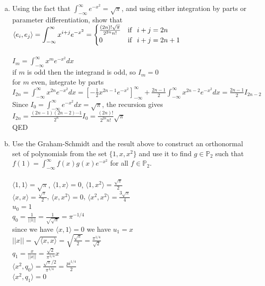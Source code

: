 \documentclass{article}
\begin{document}
{{\begin{enumerate}
\begin{enumerate}[a.]
\item Using the fact that $\displaystyle{\int^{\infty}_{-\infty}{e^{-x^2}}}=\sqrt{\pi}$, and using either integration by parts or parameter differentiation, show that $\langle e_i,e_j \rangle =\displaystyle{\int^{\infty}_{-\infty}{x^{i+j}e^{-x^2}}}=\begin{cases}\frac{(2n)!\sqrt{\pi}}{2^{2n}n!} &{\rm if}~~ i+j=2n\\ 
0 &{\rm if}~~ i+j=2n+1
\end{cases}$
\\
\\$I_m=\int^{\infty}_{-\infty}x^me^{-x^2}dx$
\\if $m$ is odd then the integrand is odd, so $I_m=0$
\\for $m$ even, integrate by parts
\\$I_{2n}=\int^{\infty}_{-\infty}x^{2n}e^{-x^2}dx=[-\frac{1}{2}x^{2n-1}e^{-x^2}]^{\infty}_{-\infty}+\frac{2n-1}{2}\int^{\infty}_{-\infty}x^{2n-2}e^{-x^2}dx=\frac{2n-1}{2}I_{2n-2}$
\\Since $I_0=\int^{\infty}_{-\infty}e^{-x^2}dx=\sqrt{\pi}$, the recursion gives
\\$I_{2n}=\frac{(2n-1)(2n-2)\cdots1}{2^n}I_0=\frac{(2n)!}{2^{2n}n!}\sqrt{\pi}$
\\QED
\\
\item Use the Graham-Schmidt and the result above to construct an orthonormal set of polynomials from the set $\{1,x,x^2\}$ and use it to find $g\in\mathbb{P}_2$ such that $f(1)=\displaystyle{\int^{\infty}_{-\infty}{f(x)g(x)e^{-x^2}}}$ for all $f\in\mathbb{P}_2$.
\\
\\$\langle1, 1\rangle=\sqrt{\pi}$, $\langle1, x\rangle=0$, $\langle1, x^2\rangle=\frac{\sqrt{\pi}}{2}$
\\$\langle x, x\rangle=\frac{\sqrt{\pi}}{2}$, $\langle x, x^2\rangle=0$, $\langle x^2, x^2\rangle=\frac{3\sqrt{\pi}}{4}$
\\$u_0=1$
\\$q_0=\frac{1}{||1||}=\frac{1}{\sqrt{\sqrt{\pi}}}=\pi^{-1/4}$
\\since we have $\langle x,1\rangle=0$ we have $u_1=x$
\\$||x||=\sqrt{\langle x,x\rangle}=\sqrt{\frac{\sqrt{\pi}}{2}}=\frac{\pi^{1/4}}{\sqrt{2}}$
\\$q_1=\frac{x}{||x||}=\frac{\sqrt{2}}{\pi^{1/4}}x$
\\$\langle x^2,q_0\rangle=\frac{\sqrt{\pi}/2}{\pi^{1/4}}=\frac{pi^{1/4}}{2}$
\\$\langle x^2,q_1\rangle=0$

\end{enumerate}
\end{enumerate}}}
\end{document}
